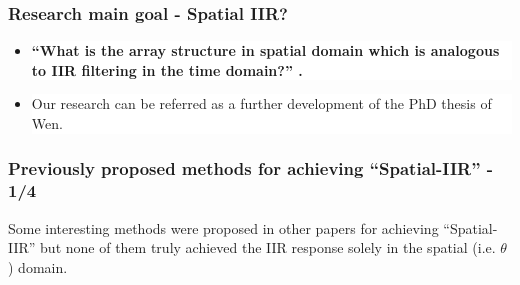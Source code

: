 \documentclass[10pt,pdflatex,headrule,landscape]{beamer}
\begin{document}
\begin{frame}
\frametitle{Research main goal - Spatial \textbf{IIR}?}

\noindent
{}
\begin{itemize}
\item{
\colorbox{white}
{\parbox{\dimexpr\linewidth-2\fboxsep}{\strut \textbf{
``What is the array structure in spatial domain which is analogous to IIR filtering in the time domain?'' \cite{wen2013array}.
}\strut}}
}
\item{
\colorbox{white}
{\parbox{\dimexpr\linewidth-2\fboxsep}{\strut Our research can be referred as a further development of the PhD thesis of Wen.\strut}} 
}
\end{itemize}


\label{frm:ResearchMainGoal_SpatialIIR}
\end{frame}

\begin{frame}
\frametitle{Previously proposed methods for achieving ``Spatial-IIR'' - 1/4}
Some interesting methods were proposed in other papers \cite{wen2013array,Madanayake2008ABeamformer,Madanayake2009SystolicWDFs,Madanayake2008AFilters,Bruton2003Three-dimensionalBanks,Ward1986ABeamforming,Joshi2012SynthesisApplications} for achieving ``Spatial-IIR'' but none of them truly achieved the IIR response solely in the spatial (i.e. $ \theta $) domain.
\end{frame}
\end{document}
